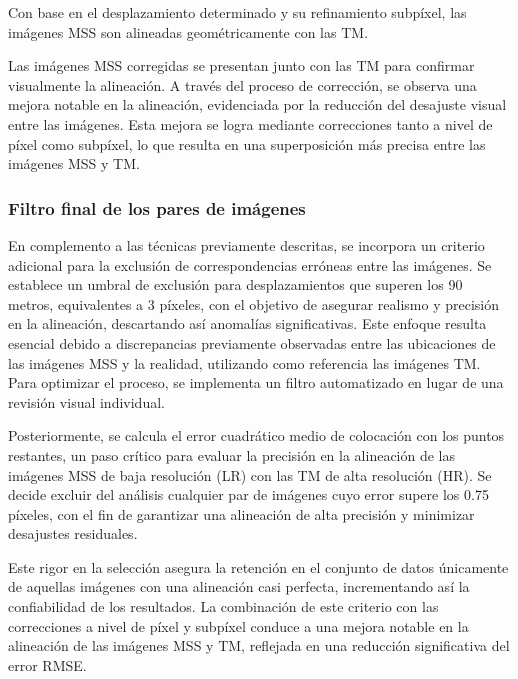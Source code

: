                 
                Con base en el desplazamiento determinado y su refinamiento subpíxel, las imágenes MSS son alineadas geométricamente con las TM.
                
                Las imágenes MSS corregidas se presentan junto con las TM para confirmar visualmente la alineación. A través del proceso de corrección, se observa una mejora notable en la alineación, evidenciada por la reducción del desajuste visual entre las imágenes. Esta mejora se logra mediante correcciones tanto a nivel de píxel como subpíxel, lo que resulta en una superposición más precisa entre las imágenes MSS y TM.
                
                
                
            \subsubsection{Filtro final de los pares de imágenes}
                En complemento a las técnicas previamente descritas, se incorpora un criterio adicional para la exclusión de correspondencias erróneas entre las imágenes. Se establece un umbral de exclusión para desplazamientos que superen los 90 metros, equivalentes a 3 píxeles, con el objetivo de asegurar realismo y precisión en la alineación, descartando así anomalías significativas. Este enfoque resulta esencial debido a discrepancias previamente observadas entre las ubicaciones de las imágenes MSS y la realidad, utilizando como referencia las imágenes TM. Para optimizar el proceso, se implementa un filtro automatizado en lugar de una revisión visual individual.

                Posteriormente, se calcula el error cuadrático medio de colocación con los puntos restantes, un paso crítico para evaluar la precisión en la alineación de las imágenes MSS de baja resolución (LR) con las TM de alta resolución (HR). Se decide excluir del análisis cualquier par de imágenes cuyo error supere los 0.75 píxeles, con el fin de garantizar una alineación de alta precisión y minimizar desajustes residuales.
            
                Este rigor en la selección asegura la retención en el conjunto de datos únicamente de aquellas imágenes con una alineación casi perfecta, incrementando así la confiabilidad de los resultados. La combinación de este criterio con las correcciones a nivel de píxel y subpíxel conduce a una mejora notable en la alineación de las imágenes MSS y TM, reflejada en una reducción significativa del error RMSE.
            
